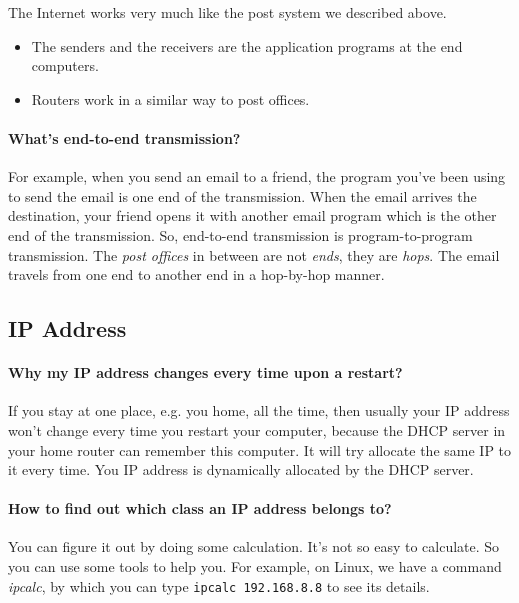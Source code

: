 \documentclass{article}
\begin{document}
The Internet works very much like the post system we described above.
\begin{itemize}
\item The senders and the receivers are the application programs at the end computers.
\item Routers work in a similar way to post offices.
\end{itemize}

\paragraph{What's end-to-end transmission?}

For example, when you send an email to a friend, the program you've been using to send the
email is one end of the transmission. When the email arrives the destination, your friend
opens it with another email program which is the other end of the transmission. So,
end-to-end transmission is program-to-program transmission. The \emph{post offices} in
between are not \emph{ends}, they are \emph{hops}. The email travels from one end to
another end in a hop-by-hop manner.

\subsection{IP Address}
\label{sec:ip-address}

\paragraph{Why my IP address changes every time upon a restart?}
\label{sec:dhcp}

If you stay at one place, e.g. you home, all the time, then usually your IP address won't
change every time you restart your computer, because the DHCP server in your home router
can remember this computer. It will try allocate the same IP to it every time.  You IP
address is dynamically allocated by the DHCP server.

\paragraph{How to find out which class an IP address belongs to?}
\label{sec:ip-addr-class}

You can figure it out by doing some calculation.  It's not so easy to calculate. So you
can use some tools to help you. For example, on Linux, we have a command \emph{ipcalc}, by
which you can type \texttt{ipcalc 192.168.8.8} to see its details.
\end{document}
